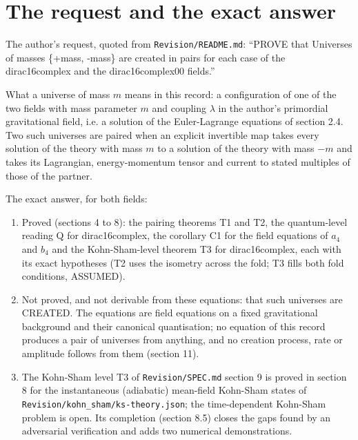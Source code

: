 \documentclass[11pt]{article}
\begin{document}
\begin{abstract}
\end{abstract}

\section{The request and the exact answer}

The author's request, quoted from \texttt{Revision\allowbreak{}/README.\allowbreak{}md}: ``PROVE that Universes of masses \{+mass, -mass\} are created in pairs for each case of the dirac16complex and the dirac16complex00 fields.''

What a universe of mass $m$ means in this record: a configuration of one of the two fields with mass parameter $m$ and coupling $\lambda$ in the author's primordial gravitational field, i.e. a solution of the Euler-Lagrange equations of section 2.4. Two such universes are paired when an explicit invertible map takes every solution of the theory with mass $m$ to a solution of the theory with mass $-m$ and takes its Lagrangian, energy-momentum tensor and current to stated multiples of those of the partner.

The exact answer, for both fields:

\begin{enumerate}
\item Proved (sections 4 to 8): the pairing theorems T1 and T2, the quantum-level reading Q for dirac16complex, the corollary C1 for the field equations of $a_4$ and $b_4$ and the Kohn-Sham-level theorem T3 for dirac16complex, each with its exact hypotheses (T2 uses the isometry across the fold; T3 fills both fold conditions, ASSUMED).
\item Not proved, and not derivable from these equations: that such universes are CREATED. The equations are field equations on a fixed gravitational background and their canonical quantisation; no equation of this record produces a pair of universes from anything, and no creation process, rate or amplitude follows from them (section 11).
\item The Kohn-Sham level T3 of \texttt{Revision\allowbreak{}/SPEC.md} section 9 is proved in section 8 for the instantaneous (adiabatic) mean-field Kohn-Sham states of \texttt{Revision\allowbreak{}/kohn\_sh\allowbreak{}am/ks-th\allowbreak{}eory.jso\allowbreak{}n}; the time-dependent Kohn-Sham problem is open. Its completion (section 8.5) closes the gaps found by an adversarial verification and adds two numerical demonstrations.
\end{enumerate}
\end{document}
